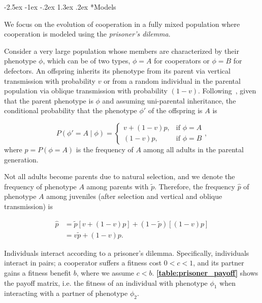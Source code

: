 \documentclass[12pt]{extarticle}
\makeatletter
\renewcommand\section{\@startsection {section}{1}{\z@}%
     {-2.5ex \@plus -1ex \@minus -.2ex}%
     {1.3ex \@plus.2ex}%
    {\Large\bfseries}}
\makeatother
\begin{document}
\section*{Models}

We focus on the evolution of cooperation in a fully mixed population where cooperation is modeled using the \emph{prisoner's dilemma}. %

Consider a very large population whose members are characterized by their phenotype $\phi$, which can be of two types, $\phi=A$ for cooperators or $\phi=B$ for defectors.
An offspring inherits its phenotype from its parent via vertical transmission with probability $v$ or from a random individual in the parental population via oblique transmission with probability $(1-v)$. 
Following~\citet{ram2018evolution}, given that the parent phenotype is $\phi$ and assuming uni-parental inheritance, %
the conditional probability that the phenotype $\phi'$ of the offspring is $A$ is 

\begin{equation} \label{eq:vertical_oblique_transmission}
P(\phi'=A \mid \phi) = \begin{cases}
v + (1-v)p, & \text{if } \phi=A \\
(1-v)p, & \text{if } \phi=B
\end{cases},
\end{equation}
where $p=P(\phi=A)$ is the frequency of $A$ among all adults in the parental generation.  

Not all adults become parents due to natural selection, and we denote the frequency of phenotype $A$ among parents with $\tilde{p}$.
Therefore, the frequency $\hat{p}$ of  phenotype $A$ among juveniles (after selection and vertical and oblique transmission) is

\begin{equation}\label{eq:horizontal}
\begin{aligned}
\hat{p}
& = \tilde{p} [v + (1-v)p] + (1-\tilde{p}) [(1-v)p] \\
& = v \tilde{p} + (1-v) p.
\end{aligned}
\end{equation}

Individuals interact according to a prisoner's dilemma.
Specifically, individuals interact in pairs; a cooperator suffers a fitness cost $0<c<1$, and its partner gains a fitness benefit $b$, where we assume $c<b$. \textbf{\autoref{table:prisoner_payoff}} shows the payoff matrix, i.e. the fitness of an individual with phenotype $\phi_1$ when interacting with a partner of phenotype $\phi_2$.
\end{document}
